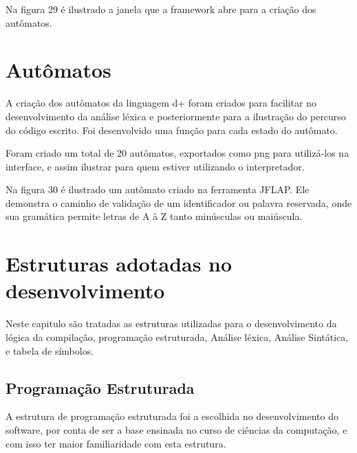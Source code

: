 \documentclass[12pt,oneside,a4paper,chapter=TITLE,section=TITLE,sumario=tradicional]{abntex2}
\begin{document}
Na figura 29 é ilustrado a janela que a framework abre para a criação dos autômatos.

\begin{figure}[htb]
\end{figure}

\section{Autômatos}
\label{sec:automatosmet}

A criação dos autômatos da linguagem d+ foram criados para facilitar no desenvolvimento da análise léxica e posteriormente para a ilustração do percurso do código escrito. Foi desenvolvido uma função para cada estado do autômato.

Foram criado um total de 20 autômatos, exportados como png para utilizá-los na interface, e assim ilustrar para quem estiver utilizando o interpretador.

Na figura 30 é ilustrado um autômato criado na ferramenta JFLAP. Ele demonstra o caminho de validação de um identificador ou palavra reservada, onde sua gramática permite letras de A à Z tanto minúsculas ou maiúscula.

\begin{figure}[htb]
\end{figure}

\section{Estruturas adotadas no desenvolvimento}
\label{sec:estruturasadotadas}

Neste capitulo são tratadas as estruturas utilizadas para o desenvolvimento da lógica da compilação, programação estruturada, Análise léxica, Análise Sintática, e tabela de símbolos.

\subsection{Programação Estruturada}
\label{subsec:programacaoestruturada}

A estrutura de programação estruturada foi a escolhida no desenvolvimento do software, por conta de ser a base ensinada no curso de ciências da computação, e com isso ter maior familiaridade com esta estrutura.
\end{document}
